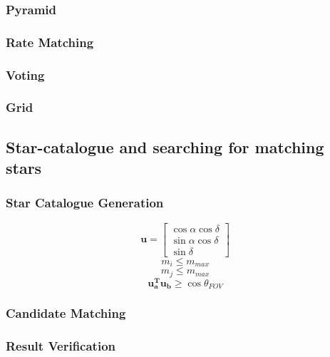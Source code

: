 \documentclass[12pt,a4paper,oneside]{article}
\begin{document}
\subsubsection{Pyramid}
\cite{mortari2004pyramid}\par

\subsubsection{Rate Matching}
\cite{rao2005fast} 
\subsubsection{Voting}
\cite{kolomenkin2008geometric} \par
\subsubsection{Grid}
\cite{padgett1997grid}
\subsection{Star-catalogue and searching for matching stars}

\subsubsection{Star Catalogue Generation}
\begin{equation}
\bm{u} = \begin{bmatrix}
\cos \alpha \cos \delta \\
\sin \alpha \cos \delta \\
\sin \delta
\end{bmatrix}
\end{equation}
\begin{equation}
m_i \leq m_{max}
\end{equation}
\begin{equation}
m_j \leq m_{max}
\end{equation}
\begin{equation}
\bm{u_a^T u_b} \geq \cos \theta_{FOV}
\end{equation}

\subsubsection{Candidate Matching}
\subsubsection{Result Verification}
\end{document}
